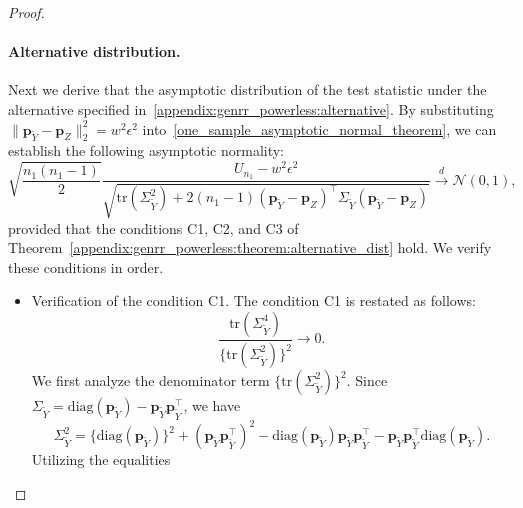 \documentclass[twoside,11pt]{article}
\newcommand{\rvTwo}{Y}
\newcommand{\rvThree}{Z}
\newcommand{\sampleSize}{n}
\newcommand{\probVec}{\mathbf{p}} %
\begin{document}
\begin{appendix}
\begin{proof}
		\paragraph{Alternative distribution.}
		Next we derive that the asymptotic distribution of the test statistic under the alternative specified in~\eqref{appendix:genrr_powerless:alternative}.
		By substituting $
		\|
		\probVec_{\tilde{\rvTwo}}
		-
		\probVec_{\rvThree}
		\|_2^2 = w^2 \epsilon^2
		$
		into~\eqref{one_sample_asymptotic_normal_theorem},
		we can establish the following asymptotic normality:
		\begin{equation}\label{genrr_ustat_asympototic_dist}
			\sqrt{
				\frac{
					\sampleSize_1(\sampleSize_1-1)
				}{
					2
				} 
			}
			\frac{
				U_{\sampleSize_1}
				-
				w^2 \epsilon^2}{
				\sqrt{
					\mathrm{tr}(\Sigma_{\tilde{\rvTwo}}^2)
					+
					2(\sampleSize_1 - 1)
					(\probVec_{\tilde{\rvTwo}} - \probVec_\rvThree)^\top 
					\Sigma_{\tilde{\rvTwo}}
					(\probVec_{\tilde{\rvTwo}} - \probVec_\rvThree)	
				}
			}
			\stackrel{d}{\to}
			\mathcal{N}(0,1),
		\end{equation}
		provided that the conditions C1, C2, and C3 of  Theorem~\ref{appendix:genrr_powerless:theorem:alternative_dist} hold.
		We verify these conditions in order.
		\begin{itemize}
			\item Verification of the condition C1. The condition C1 is restated as follows:
			\begin{equation*}%
				\frac{
					\mathrm{tr}(\Sigma_{\tilde{\rvTwo}}^4)
				}{
					\bigl\{
					\mathrm{tr}(\Sigma_{\tilde{\rvTwo}}^2)
					\bigr\}^2   
				}
				\to
				0.
			\end{equation*}
			We first analyze the denominator term $\bigl\{
			\mathrm{tr}(\Sigma_{\tilde{\rvTwo}}^2)
			\bigr\}^2 $. Since $\Sigma_{\tilde{\rvTwo}}  = \mathrm{diag}(\probVec_{\tilde{\rvTwo}}) - \probVec_{\tilde{\rvTwo}} \probVec_{\tilde{\rvTwo}}^\top$,
			we have 
			\begin{equation*}%
				\Sigma_{\tilde{\rvTwo}}^2
				= 
				\{ \mathrm{diag}(\probVec_{\tilde{\rvTwo}})
				\}^2
				+
				( \probVec_{\tilde{\rvTwo}} \probVec_{\tilde{\rvTwo}}^\top )^2
				-
				\mathrm{diag}(\probVec_{\tilde{\rvTwo}})\probVec_{\tilde{\rvTwo}} \probVec_{\tilde{\rvTwo}}^\top
				-
				\probVec_{\tilde{\rvTwo}} \probVec_{\tilde{\rvTwo}}^\top
				\mathrm{diag}(\probVec_{\tilde{\rvTwo}})
				. 
			\end{equation*}
			\sloppy Utilizing the equalities

\end{itemize}
\end{proof}
\end{appendix}
\end{document}
